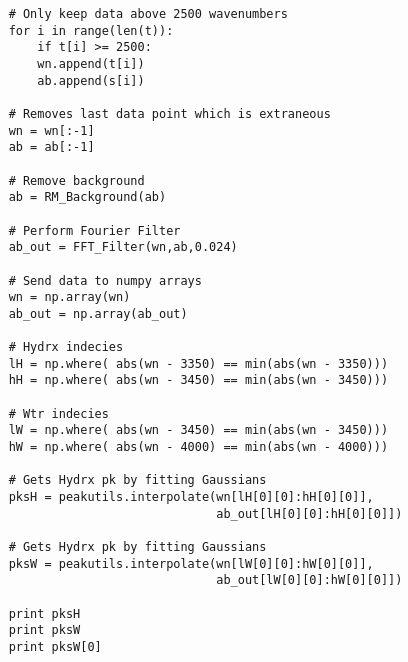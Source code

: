 \begin{singlespace}
\begin{verbatim}
    # Only keep data above 2500 wavenumbers
    for i in range(len(t)):
        if t[i] >= 2500:
        wn.append(t[i])
        ab.append(s[i])
    
    # Removes last data point which is extraneous
    wn = wn[:-1]
    ab = ab[:-1]
    
    # Remove background
    ab = RM_Background(ab)
    
    # Perform Fourier Filter
    ab_out = FFT_Filter(wn,ab,0.024)
    
    # Send data to numpy arrays
    wn = np.array(wn)
    ab_out = np.array(ab_out)
    
    # Hydrx indecies
    lH = np.where( abs(wn - 3350) == min(abs(wn - 3350)))
    hH = np.where( abs(wn - 3450) == min(abs(wn - 3450)))
    
    # Wtr indecies
    lW = np.where( abs(wn - 3450) == min(abs(wn - 3450)))
    hW = np.where( abs(wn - 4000) == min(abs(wn - 4000)))
    
    # Gets Hydrx pk by fitting Gaussians
    pksH = peakutils.interpolate(wn[lH[0][0]:hH[0][0]], 
                                 ab_out[lH[0][0]:hH[0][0]])

    # Gets Hydrx pk by fitting Gaussians
    pksW = peakutils.interpolate(wn[lW[0][0]:hW[0][0]],
                                 ab_out[lW[0][0]:hW[0][0]])
    
    print pksH
    print pksW
    print pksW[0]
\end{verbatim}
\end{singlespace}

\newpage
